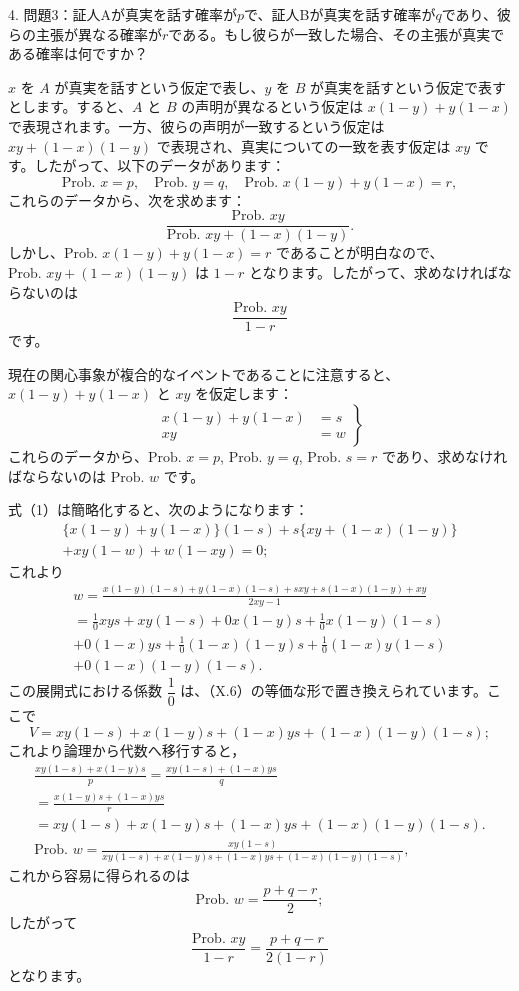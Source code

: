 \documentclass[a4paper,11pt,openany]{ltjsbook}
\begin{document}
4. 問題3：証人Aが真実を話す確率が$p$で、証人Bが真実を話す確率が$q$であり、彼らの主張が異なる確率が$r$である。もし彼らが一致した場合、その主張が真実である確率は何ですか？

$x$ を $A$ が真実を話すという仮定で表し、$y$ を $B$ が真実を話すという仮定で表すとします。すると、$A$ と $B$ の声明が異なるという仮定は $x(1-y) + y(1-x)$ で表現されます。一方、彼らの声明が一致するという仮定は $xy + (1-x)(1-y)$ で表現され、真実についての一致を表す仮定は $xy$ です。したがって、以下のデータがあります：
\[
\text{Prob. } x = p, \quad \text{Prob. } y = q, \quad
\text{Prob. } x(1-y) + y(1-x) = r,
\]
これらのデータから、次を求めます：
\[
\frac{\text{Prob. } xy}{\text{Prob. } xy + (1-x)(1-y)}.
\]
しかし、$\text{Prob. } x(1-y) + y(1-x) = r$ であることが明白なので、$\text{Prob. } xy + (1-x)(1-y)$ は $1-r$ となります。したがって、求めなければならないのは
\[
\frac{\text{Prob. } xy}{1-r}
\]
です。

現在の関心事象が複合的なイベントであることに注意すると、$x(1-y) + y(1-x)$ と $xy$ を仮定します：
\[
\left.
\begin{array}{cccccc}
  x(1-y) + y(1-x) &= s   \\
  xy              &= w
\end{array}
\right\} \tag{1}
\]
これらのデータから、$\text{Prob. } x = p$, $\text{Prob. } y = q$, $\text{Prob. } s = r$ であり、求めなければならないのは $\text{Prob. } w$ です。

式（1）は簡略化すると、次のようになります：
\begin{multline*}
  \{x(1-y) + y(1-x)\}(1-s) + s\{xy + (1-x)(1-y)\}   \\
  + xy(1-w) + w(1-xy) = 0;
\end{multline*}
これより
\begin{gather*}
w  = \frac{x(1-y)(1-s) + y(1-x)(1-s) + sxy + s(1-x)(1-y) + xy}{2xy-1}\\
   = \frac{1}{0}xys + xy(1-s) + 0x(1-y)s + \frac{1}{0}x(1-y)(1-s) \\
   + 0(1-x)ys + \frac{1}{0}(1-x)(1-y)s + \frac{1}{0}(1-x)y(1-s)\\
   + 0(1-x)(1-y)(1-s).
\end{gather*}
この展開式における係数 $\dfrac{1}{0}$ は、（X.6）の等価な形で置き換えられています。ここで
\[
V = xy(1-s) + x(1-y)s + (1-x)ys + (1-x)(1-y)(1-s);
\]
これより論理から代数へ移行すると，
\begin{gather*}
    \frac{xy(1-s) + x(1-y)s}{p} = \frac{xy(1-s) + (1-x)ys}{q}   \\
  = \frac{x(1-y)s + (1-x)ys}{r}\\
= xy(1-s) + x(1-y)s + (1-x)ys + (1-x)(1-y)(1-s).   \\
  \textrm{Prob. }w
= \frac{xy(1-s)}{xy(1-s) + x(1-y)s + (1-x)ys + (1-x)(1-y)(1-s)},
\end{gather*}
これから容易に得られるのは
\[
  \textrm{Prob. }w = \frac{p+q-r}{2};
\]
したがって
\[
  \frac{\text{Prob. }xy }{1-r} = \frac{p+q-r}{2(1-r)}  \tag{3}
\]
となります。
\end{document}
